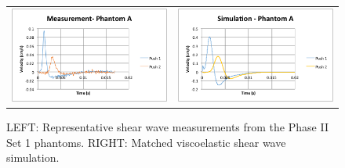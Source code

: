\begin{figure}[htb!]
    \centering
    \begin{tabular}{cc}
        \includegraphics[width=0.5\linewidth]{steve/figs/image16.png} &
        \includegraphics[width=0.5\linewidth]{steve/figs/image17.png} \\
    \end{tabular}
    \caption{LEFT: Representative shear wave measurements from the Phase II Set
        1 phantoms.  RIGHT: Matched viscoelastic shear wave simulation.}
\label{fig:steve-phantomA}
\end{figure}
